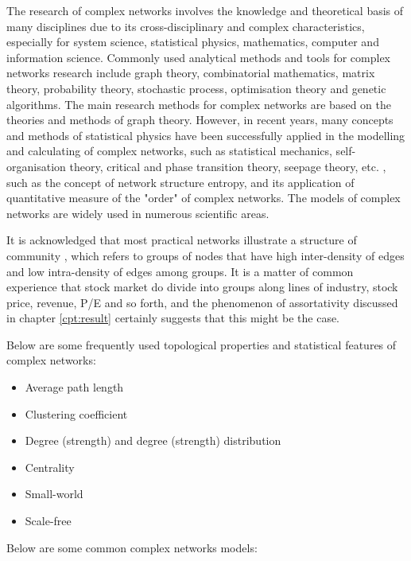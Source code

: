 The research of complex networks involves the knowledge and theoretical basis of many disciplines due to its cross-disciplinary and complex characteristics, especially for system science, statistical physics, mathematics, computer and information science. Commonly used analytical methods and tools for complex networks research include graph theory, combinatorial mathematics, matrix theory, probability theory, stochastic process, optimisation theory and genetic algorithms. The main research methods for complex networks are based on the theories and methods of graph theory. However, in recent years, many concepts and methods of statistical physics have been successfully applied in the modelling and calculating of complex networks, such as statistical mechanics, self-organisation theory, critical and phase transition theory, seepage theory, etc. \cite{albert2002statistical}, such as the concept of network structure entropy, and its application of quantitative measure of the "order" of complex networks. The models of complex networks are widely used in numerous scientific areas.

It is acknowledged that most practical networks illustrate a structure of community \cite{vazquez2003constrained, newman2003structure}, which refers to groups of nodes that have high inter-density of edges and low intra-density of edges among groups.
It is a matter of common experience that stock market do divide into groups along lines of industry, stock price, revenue, P/E and so forth, and the phenomenon of assortativity discussed in chapter \ref{cpt:result} certainly suggests that this might be the case.

\vline

Below are some frequently used topological properties and statistical features of complex networks:

\begin{itemize}
	\item Average path length
	\item Clustering coefficient
	\item Degree (strength) and degree (strength) distribution
	\item Centrality
	\item Small-world
	\item Scale-free
\end{itemize}

\vline

Below are some common complex networks models:

